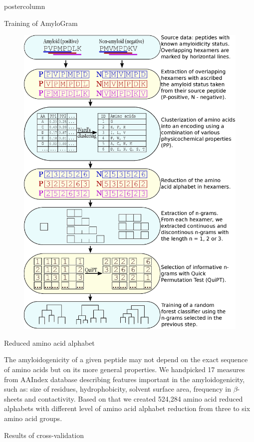 \documentclass[final]{beamer}\usepackage[]{graphicx}\usepackage[]{color}
\begin{document}
\begin{frame}
\begin{columns}
\begin{column}{.50\textwidth}
\begin{beamercolorbox}[center,wd=\textwidth]{postercolumn}
\begin{minipage}[T]{.95\textwidth}
{\begin{block}{Training of AmyloGram}
\begin{figure} 
\includegraphics[width=0.85\columnwidth]{static_figure/ngram_scheme_poster.eps}
\end{figure}

    \end{block}


\begin{block}{Reduced amino acid alphabet}

The amyloidogenicity of a given peptide may not depend on the exact sequence of 
amino acids but on its more general properties. We 
handpicked 17 measures from AAIndex database 
describing features important in the amyloidogenicity, such as: size of 
residues, hydrophobicity, solvent surface area, frequency in $\beta$-sheets and 
contactivity. Based on that we created 524,284 amino acid reduced alphabets with different level of 
amino acid alphabet reduction from three to six amino acid groups.

    \end{block}

\begin{block}{Results of cross-validation}


\end{block}}
\end{minipage}
\end{beamercolorbox}
\end{column}
\end{columns}
\end{frame}
\end{document}
